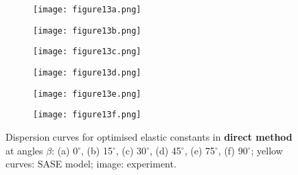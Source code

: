 \documentclass[preprint,12pt]{elsarticle}
\providecommand{\DIFdelend}{} %
\providecommand{\DIFaddbeginFL}{} %
\providecommand{\DIFaddendFL}{} %
\providecommand{\DIFdelbeginFL}{} %
\providecommand{\DIFdelendFL}{} %
\begin{document}
\DIFdelend \begin{figure} [h!]
	\DIFdelbeginFL %
\DIFdelendFL \centering
	\begin{subfigure}[b]{0.49\textwidth}
		\centering
		\DIFdelbeginFL %
\DIFdelendFL \DIFaddbeginFL \texttt{[image: figure13a.png]}
		\DIFaddendFL \caption{}
		\label{fig:dispersion0deg_direct}
	\end{subfigure}
	\begin{subfigure}[b]{0.49\textwidth}
		\centering
		\DIFdelbeginFL %
\DIFdelendFL \DIFaddbeginFL \texttt{[image: figure13b.png]}
		\DIFaddendFL \caption{}
		\label{fig:dispersion15deg_direct}
	\end{subfigure}
	\begin{subfigure}[b]{0.49\textwidth}
		\centering
		\DIFdelbeginFL %
\DIFdelendFL \DIFaddbeginFL \texttt{[image: figure13c.png]}
		\DIFaddendFL \caption{}
		\label{fig:dispersion30deg_direct}
	\end{subfigure}
	\begin{subfigure}[b]{0.49\textwidth}
		\centering
		\DIFdelbeginFL %
\DIFdelendFL \DIFaddbeginFL \texttt{[image: figure13d.png]}
		\DIFaddendFL \caption{}
		\label{fig:dispersion45deg_direct}
	\end{subfigure}
	\begin{subfigure}[b]{0.49\textwidth}
		\centering
		\DIFdelbeginFL %
\DIFdelendFL \DIFaddbeginFL \texttt{[image: figure13e.png]}
		\DIFaddendFL \caption{}
		\label{fig:dispersion75deg_direct}
	\end{subfigure}
	\begin{subfigure}[b]{0.49\textwidth}
		\centering
		\DIFdelbeginFL %
\DIFdelendFL \DIFaddbeginFL \texttt{[image: figure13f.png]}
		\DIFaddendFL \caption{}
		\label{fig:dispersion90deg_direct}
	\end{subfigure}
	\caption{Dispersion curves for optimised elastic constants in \textbf{direct method} at angles $\beta$: (a) 0$^{\circ}$, (b) 15$^{\circ}$, (c) 30$^{\circ}$, (d) 45$^{\circ}$, (e) 75$^{\circ}$, (f) 90$^{\circ}$; yellow curves: SASE model; image: experiment. }
	\label{fig:optimized_direct}
\end{figure}
\end{document}
